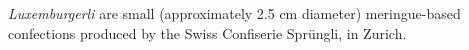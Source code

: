 \emph{Luxemburgerli} are small (approximately 2.5 cm diameter) meringue-based confections produced by the Swiss Confiserie Spr\"ungli, in Zurich.

